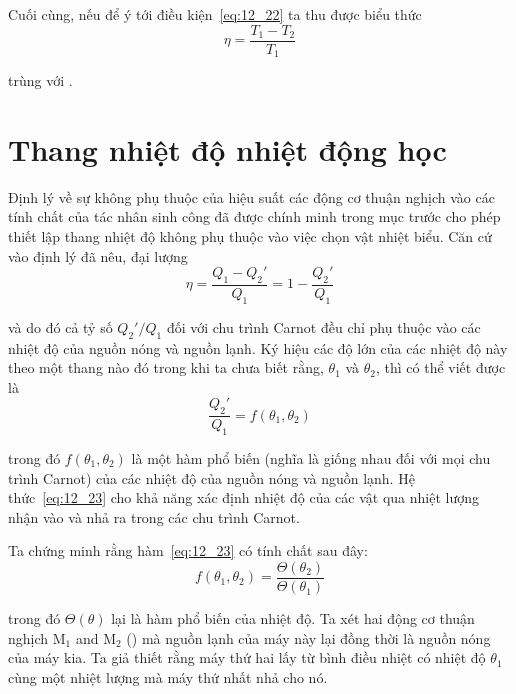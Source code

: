 \noindent
Cuối cùng, nếu để ý tới điều kiện~\eqref{eq:12_22} ta thu được biểu thức
\begin{equation*}
	\eta = \frac{T_1 - T_2}{T_1}
\end{equation*}

\noindent
trùng với .

\section{Thang nhiệt độ nhiệt động học}\label{sec:12_3}

Định lý về sự không phụ thuộc của hiệu suất các động cơ thuận nghịch vào các tính chất của tác nhân sinh công đã được chính minh trong mục trước cho phép thiết lập thang nhiệt độ không phụ thuộc vào việc chọn vật nhiệt biểu. Căn cứ vào định lý đã nêu, đại lượng
\begin{equation*}
	\eta = \frac{Q_1 - Q_2'}{Q_1} = 1 - \frac{Q_2'}{Q_1}
\end{equation*}

\noindent
và do đó cả tỷ số $Q_2'/Q_1$ đối với chu trình Carnot đều chỉ phụ thuộc vào các nhiệt độ của nguồn nóng và nguồn lạnh. Ký hiệu các độ lớn của các nhiệt độ này theo một thang nào đó trong khi ta chưa biết rằng, $\theta_1$ và $\theta_2$, thì có thể viết được là
\begin{equation}\label{eq:12_23}
	\frac{Q_2'}{Q_1} = f(\theta_1,\theta_2)
\end{equation}

\noindent
trong đó $f(\theta_1,\theta_2)$ là một hàm phổ biến (nghĩa là giống nhau đối với mọi chu trình Carnot) của các nhiệt độ của nguồn nóng và nguồn lạnh. Hệ thức~\eqref{eq:12_23} cho khả năng xác định nhiệt độ của các vật qua nhiệt lượng nhận vào và nhả ra trong các chu trình Carnot.

Ta chứng minh rằng hàm~\eqref{eq:12_23} có tính chất sau đây:
\begin{equation}\label{eq:12_24}
	f(\theta_1,\theta_2) = \frac{\Theta(\theta_2)}{\Theta(\theta_1)}
\end{equation}

\noindent
trong đó $\Theta(\theta)$ lại là hàm phổ biến của nhiệt độ. Ta xét hai động cơ thuận nghịch M$_1$ and M$_2$ () mà nguồn lạnh của máy này lại đồng thời là nguồn nóng của máy kia. Ta giả thiết rằng máy thứ hai lấy từ bình điều nhiệt có nhiệt độ $\theta_1$ cùng một nhiệt lượng mà máy thứ nhất nhả cho nó.

